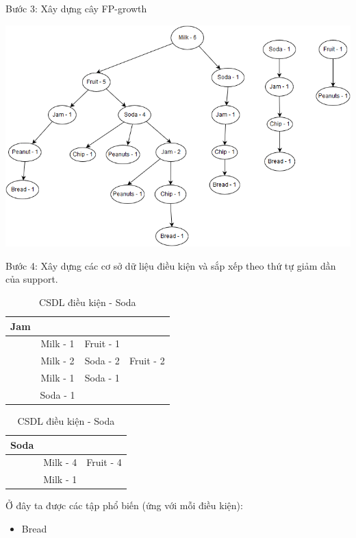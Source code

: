 \documentclass{article}
\begin{document}
\begin{flushleft}
Bước 3: Xây dựng cây FP-growth\\ 
\begin{center}
\includegraphics[scale = 0.5]{Tree.png}
\end{center}
Bước 4: Xây dựng các cơ sở dữ liệu điều kiện và sắp xếp theo thứ tự giảm dần của support.
\begin{table}[H]
	\centering
	\begin{minipage}[t]{\textwidth}
	\caption{CSDL điều kiện - Jam}
	\begin{tabular}{| c | c | c | c |}
		\hline
		Jam &&& \\ \hline
		&Milk - 1 & Fruit - 1 & \\ \hline
		&Milk - 2 & Soda - 2 & Fruit - 2  \\ \hline
		&Milk - 1 & Soda - 1 &  \\ \hline
		&Soda - 1 & & \\ \hline
	\end{tabular}
	\end{minipage}%
	\begin{minipage}[t]{\textwidth}
		\caption{CSDL điều kiện - Soda}
		\begin{tabular}{| c | c | c |}
			\hline
			Soda && \\ \hline
			&Milk - 4 & Fruit - 4  \\ \hline
			&Milk - 1 &  \\ \hline
		\end{tabular}
	\end{minipage}%
\end{table}
Ở đây ta được các tập phổ biến (ứng với mỗi điều kiện):\\
\begin{itemize}
	\item Bread

\end{itemize}
\end{flushleft}
\end{document}
